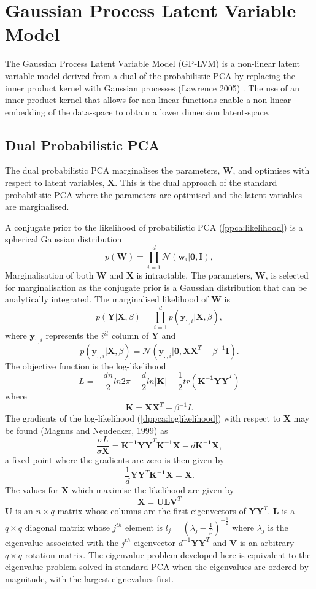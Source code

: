 \documentclass[ %
                    author={Dillon Keith Diep},
                supervisor={Dr. Carl Henrik Ek},
                    degree={MEng},
                     title={Assisted Content Generation for 3D Hair Geometry},
                  subtitle={[INCOMPLETE DRAFT, NOT FOR SUBMISSION]},
                      type={Research},
                      year={2014} ]{dissertation}
\begin{document}
\section{Gaussian Process Latent Variable Model}
The Gaussian Process Latent Variable Model (GP-LVM) is a non-linear latent variable model derived from a dual of the probabilistic PCA by replacing the inner product kernel with Gaussian processes (Lawrence 2005) \cite{gplvm}. The use of an inner product kernel that allows for non-linear functions enable a non-linear embedding of the data-space to obtain a lower dimension latent-space. 

\subsection{Dual Probabilistic PCA}
The dual probabilistic PCA marginalises the parameters, $\mathbf{W}$, and optimises with respect to latent variables, $\mathbf{X}$. This is the dual approach of the standard probabilistic PCA where the parameters are optimised and the latent variables are marginalised.

A conjugate prior to the likelihood of probabilistic PCA (\ref{ppca:likelihood}) is a spherical Gaussian distribution
$$p(\mathbf{W})=\prod^d_{i=1}\mathcal{N}(\mathbf{w}_i|\mathbf{0,I}),$$
Marginalisation of both $\mathbf{W}$ and $\mathbf{X}$ is intractable. 
The parameters, $\mathbf{W}$, is selected for marginalisation as the conjugate prior is a Gaussian distribution that can be analytically integrated.
The marginalised likelihood of $\mathbf{W}$ is
$$p(\mathbf{Y|X},\beta)=\prod^d_{i=1}p(\mathbf{y}_{:,i}|\mathbf{X},\beta),$$
where $\mathbf{y}_{:,i}$ represents the $i^{it}$ column of $\mathbf{Y}$ and
$$p(\mathbf{y}_{:,i}|\mathbf{X},\beta)=\mathcal{N}(\mathbf{y}_{:,i}|\mathbf{0,XX}^T+\beta^{-1}\mathbf{I}).$$
The objective function is the log-likelihood
\begin{equation} \label{dppca:loglikelihood}
	L=-\frac{dn}{2}ln2\pi-\frac{d}{2}ln|\mathbf{K}|-\frac{1}{2}tr(\mathbf{K^{-1}YY}^T)
\end{equation}
where $$\mathbf{K=XX}^T+\beta^{-1}I.$$
{\color{red}The gradients of the log-likelihood (\ref{dppca:loglikelihood}) with respect to $\mathbf{X}$ may be found (Magnus and Neudecker, 1999) as}
$$\frac{\sigma L}{\sigma \mathbf{X}}=\mathbf{K^{-1}YY}^T\mathbf{K^{-1}X}-d\mathbf{K^{-1}X},$$
a fixed point where the gradients are zero is then given by 
$$\frac{1}{d}\mathbf{YY}^T\mathbf{K^{-1}X=X}.$$
The values for $\mathbf{X}$ which maximise the likelihood are given by 
$$\mathbf{X=ULV}^T$$
$\mathbf{U}$ is an $n \times q$ matrix whose columns are the first eigenvectors of $\mathbf{YY}^T$. $\mathbf{L}$ is a $q \times q$ diagonal matrix whose $j^{th}$ element is $l_j=(\lambda_j-\frac{1}{\beta})^{-\frac{1}{2}}$ where $\lambda_j$ is the eigenvalue associated with the $j^{th}$ eigenvector $d^{-1}\mathbf{YY}^T$ and $\mathbf{V}$ is an arbitrary $q\times q$ rotation matrix. The eigenvalue problem developed here is equivalent to the eigenvalue problem solved in standard PCA when the eigenvalues are ordered by magnitude, with the largest eignevalues first.
\end{document}
